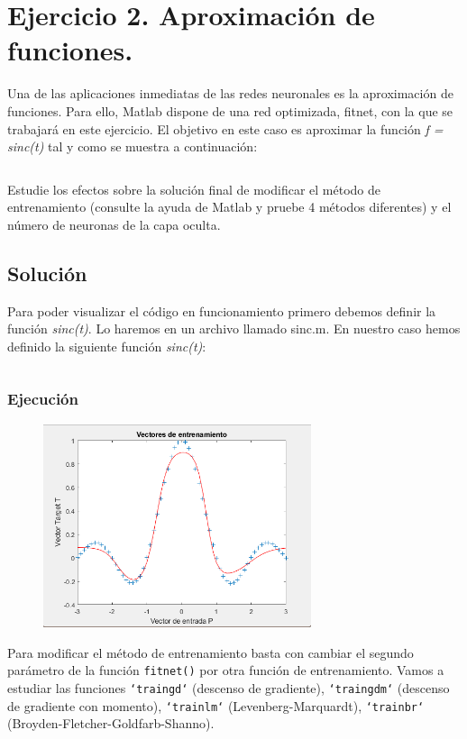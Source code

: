 \documentclass[a4paper, 12pt]{article}
\begin{document}
    
    \section{Ejercicio 2. Aproximación de funciones.}
    
        Una de las aplicaciones inmediatas de las redes neuronales es la aproximación de funciones. Para ello, Matlab dispone de una red optimizada, fitnet, con la que se trabajará en este ejercicio. El objetivo en este caso es aproximar la función \emph{f = sinc(t)} tal y como se muestra a continuación:

        \inputminted[fontsize=\scriptsize, linenos, breaklines=true, xleftmargin=0.75cm, frame=lines]{matlab}{code/parte1/Ej2.m}

        Estudie los efectos sobre la solución final de modificar el método de entrenamiento (consulte la ayuda de Matlab y pruebe 4 métodos diferentes) y el número de neuronas de la capa oculta.

        \subsection{Solución}
            Para poder visualizar el código en funcionamiento primero debemos definir la función \emph{sinc(t)}. Lo haremos en un archivo llamado sinc.m. En nuestro caso hemos definido la siguiente función \emph{sinc(t)}:

            \inputminted[fontsize=\scriptsize, linenos, breaklines=true, xleftmargin=0.75cm, frame=lines]{matlab}{code/parte1/sinc.m}

            \subsubsection{Ejecución}
                \begin{figure}[htp!]
                    \centering
    		      \includegraphics[width=0.7\textwidth]{figures/parte1/Ej2/Ej2_fig0_codigo_enunciado.png}
                \end{figure}
            
            Para modificar el método de entrenamiento basta con cambiar el segundo parámetro de la función \texttt{fitnet()} por otra función de entrenamiento. Vamos a estudiar las funciones \texttt{`traingd`} (descenso de gradiente), \texttt{`traingdm`} (descenso de gradiente con momento), \texttt{`trainlm`} (Levenberg-Marquardt), \texttt{`trainbr`} (Broyden-Fletcher-Goldfarb-Shanno).
            


 
\end{document}
